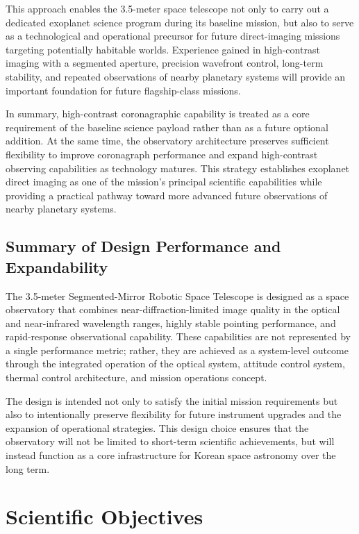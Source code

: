 This approach enables the 3.5-meter space telescope not only to carry out a dedicated exoplanet science program during its baseline mission, but also to serve as a technological and operational precursor for future direct-imaging missions targeting potentially habitable worlds. Experience gained in high-contrast imaging with a segmented aperture, precision wavefront control, long-term stability, and repeated observations of nearby planetary systems will provide an important foundation for future flagship-class missions.

In summary, high-contrast coronagraphic capability is treated as a core requirement of the baseline science payload rather than as a future optional addition. At the same time, the observatory architecture preserves sufficient flexibility to improve coronagraph performance and expand high-contrast observing capabilities as technology matures. This strategy establishes exoplanet direct imaging as one of the mission's principal scientific capabilities while providing a practical pathway toward more advanced future observations of nearby planetary systems.



\section{Summary of Design Performance and Expandability}\label{summary-of-design-performance-and-expandability}

The 3.5-meter Segmented-Mirror Robotic Space Telescope is designed as a space observatory that combines near-diffraction-limited image quality in the optical and near-infrared wavelength ranges, highly stable pointing performance, and rapid-response observational capability. These capabilities are not represented by a single performance metric; rather, they are achieved as a system-level outcome through the integrated operation of the optical system, attitude control system, thermal control architecture, and mission operations concept.

The design is intended not only to satisfy the initial mission requirements but also to intentionally preserve flexibility for future instrument upgrades and the expansion of operational strategies. This design choice ensures that the observatory will not be limited to short-term scientific achievements, but will instead function as a core infrastructure for Korean space astronomy over the long term.

\chapter{Scientific Objectives}
